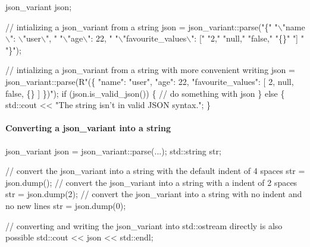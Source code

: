 \begin{DoxyCode}
json\_variant json;

\textcolor{comment}{// intializing a json\_variant from a string}
json = json\_variant::parse(\textcolor{stringliteral}{"\{"} 
    \textcolor{stringliteral}{"\(\backslash\)"name\(\backslash\)": \(\backslash\)"user\(\backslash\)", "}
    \textcolor{stringliteral}{"\(\backslash\)"age\(\backslash\)": 22, "}
    \textcolor{stringliteral}{"\(\backslash\)"favourite\_values\(\backslash\)": ["}
        \textcolor{stringliteral}{"2,"}
        \textcolor{stringliteral}{"null,"}
        \textcolor{stringliteral}{"false,"}
        \textcolor{stringliteral}{"\{\}"}
    \textcolor{stringliteral}{"] "}
\textcolor{stringliteral}{"\}"});

\textcolor{comment}{// intializing a json\_variant from a string with more convenient writing}
json = json\_variant::parse(R\textcolor{stringliteral}{"(\{}
\textcolor{stringliteral}{    "name": "user",}
\textcolor{stringliteral}{    "age": 22,}
\textcolor{stringliteral}{    "favourite\_values": [}
\textcolor{stringliteral}{        2,}
\textcolor{stringliteral}{        null,}
\textcolor{stringliteral}{        false,}
\textcolor{stringliteral}{        \{\}}
\textcolor{stringliteral}{    ]}
\textcolor{stringliteral}{\})");}
\textcolor{stringliteral}{}
\textcolor{stringliteral}{}\textcolor{keywordflow}{if} (json.is\_valid\_json()) \{
    \textcolor{comment}{// do something with json}
\}
\textcolor{keywordflow}{else} \{        
    std::cout << \textcolor{stringliteral}{"The string isn't in valid JSON syntax."};
\}
\end{DoxyCode}


\paragraph*{\label{_convert_a_json_to_string_section}%
Converting a json\+\_\+variant into a string}


\begin{DoxyCode}
json\_variant json = json\_variant::parse(...);
std::string str;

\textcolor{comment}{// convert the json\_variant into a string with the default indent of 4 spaces}
str = json.dump();
\textcolor{comment}{// convert the json\_variant into a string with a indent of 2 spaces}
str = json.dump(2);
\textcolor{comment}{// convert the json\_variant into a string with no indent and no new lines}
str = json.dump(0);

\textcolor{comment}{// converting and writing the json\_variant into std::ostream directly is also possible}
std::cout << json << std::endl;
\end{DoxyCode}


